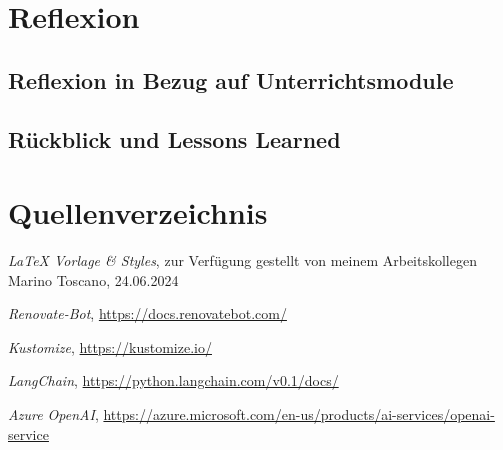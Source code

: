 \documentclass{bpraxis}
\begin{document}
\section{Reflexion}

\subsection{Reflexion in Bezug auf Unterrichtsmodule}

\subsection{Rückblick und Lessons Learned}





\section{Quellenverzeichnis}

\textit{LaTeX Vorlage & Styles}, zur Verfügung gestellt von meinem Arbeitskollegen Marino Toscano, 24.06.2024\label{lit:latex-vorlage}

\textit{Renovate-Bot}, \href{https://docs.renovatebot.com/}{https://docs.renovatebot.com/}\label{lit:renovatebot}

\textit{Kustomize}, \href{https://kustomize.io/}{https://kustomize.io/}\label{lit:kustomize}

\textit{LangChain}, \href{https://python.langchain.com/v0.1/docs/}{https://python.langchain.com/v0.1/docs/}\label{lit:langchain}

\textit{Azure OpenAI}, \href{https://azure.microsoft.com/en-us/products/ai-services/openai-service}{https://azure.microsoft.com/en-us/products/ai-services/openai-service}\label{lit:azure-openai}
\end{document}
